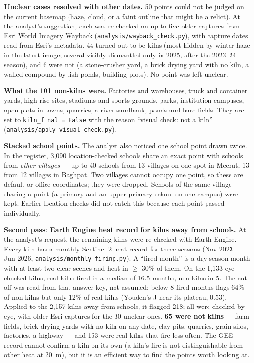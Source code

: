 \documentclass[11pt,a4paper]{article}
\begin{document}
\textbf{Unclear cases resolved with other dates.} 50 points could not be judged
on the current basemap (haze, cloud, or a faint outline that might be a relict).
At the analyst's suggestion, each was re-checked on up to five older captures
from Esri World Imagery Wayback (\texttt{analysis/wayback\_check.py}), with
capture dates read from Esri's metadata. 44 turned out to be kilns (most hidden
by winter haze in the latest image; several visibly dismantled only in 2025,
after the 2023--24 season), and 6 were not (a stone-crusher yard, a brick drying
yard with no kiln, a walled compound by fish ponds, building plots). No point was
left unclear.

\textbf{What the 101 non-kilns were.} Factories and warehouses, truck and container
yards, high-rise sites, stadiums and sports grounds, parks, institution campuses,
open plots in towns, quarries, a river sandbank, ponds and bare fields. They are
set to \texttt{kiln\_final = False} with the reason ``visual check: not a kiln''
(\texttt{analysis/apply\_visual\_check.py}).

\textbf{Stacked school points.} The analyst also noticed one school point drawn
twice. In the register, 3{,}090 location-checked schools share an exact point with
schools from \emph{other villages} --- up to 40 schools from 13 villages on one
spot in Meerut, 13 from 12 villages in Baghpat. Two villages cannot occupy one
point, so these are default or office coordinates; they were dropped. Schools of
the same village sharing a point (a primary and an upper-primary school on one
campus) were kept. Earlier location checks did not catch this because each point
passed individually.

\textbf{Second pass: Earth Engine heat record for kilns away from schools.} At the
analyst's request, the remaining kilns were re-checked with Earth Engine. Every
kiln has a monthly Sentinel-2 heat record for three seasons (Nov 2023 -- Jun 2026,
\texttt{analysis/monthly\_firing.py}). A ``fired month'' is a dry-season month with
at least two clear scenes and heat in $\geq$ 30\% of them. On the 1{,}133
eye-checked kilns, real kilns fired in a median of 16.5 months, non-kilns in 5.
The cut-off was read from that answer key, not assumed: below 8 fired months flags
64\% of non-kilns but only 12\% of real kilns (Youden's J near its plateau, 0.53).
Applied to the 2{,}157 kilns away from schools, it flagged 218; all were checked by
eye, with older Esri captures for the 30 unclear ones. \textbf{65 were not kilns}
--- farm fields, brick drying yards with no kiln on any date, clay pits, quarries,
grain silos, factories, a highway --- and 153 were real kilns that fire less
often. The GEE record cannot confirm a kiln on its own (a kiln's fire is not
distinguishable from other heat at 20~m), but it is an efficient way to find the
points worth looking at.
\end{document}
